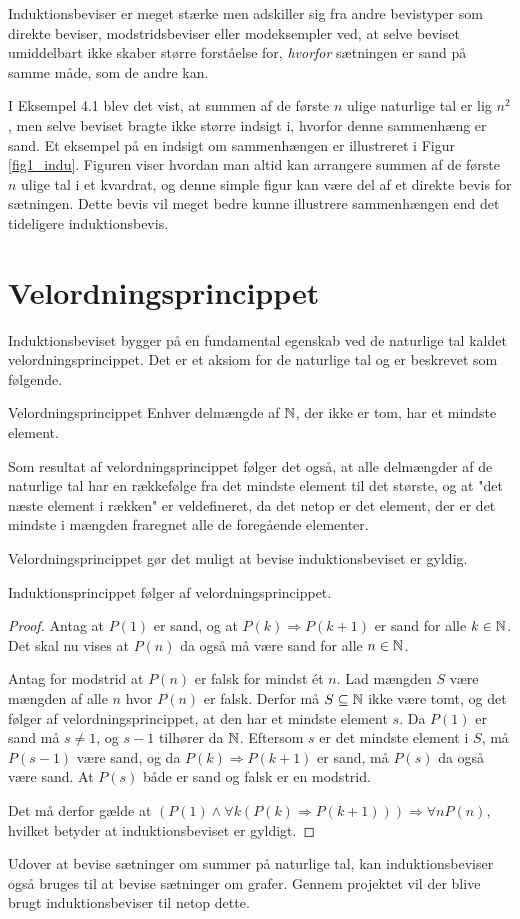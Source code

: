 Induktionsbeviser er meget stærke men adskiller sig fra andre bevistyper som direkte beviser, modstridsbeviser eller modeksempler ved, at selve beviset umiddelbart ikke skaber større forståelse for, \textit{hvorfor} sætningen er sand på samme måde, som de andre kan.

I Eksempel 4.1 blev det vist, at summen af de første $n$ ulige naturlige tal er lig $n^2$, men selve beviset bragte ikke større indsigt i, hvorfor denne sammenhæng er sand.
Et eksempel på en indsigt om sammenhængen er illustreret i  Figur \ref{fig1_indu}.
Figuren viser hvordan man altid kan arrangere summen af de første $n$ ulige tal i et kvardrat, og denne simple figur kan være del af et direkte bevis for sætningen.
Dette bevis vil meget bedre kunne illustrere sammenhængen end det tideligere induktionsbevis.

\section{Velordningsprincippet}
Induktionsbeviset bygger på en fundamental egenskab ved de naturlige tal kaldet velordningsprincippet.
Det er et aksiom for de naturlige tal og er beskrevet som følgende.
\begin{theorembox}{Velordningsprincippet}
	Enhver delmængde af $\mathbb{N}$, der ikke er tom, har et mindste element.
\end{theorembox}
\noindent Som resultat af velordningsprincippet følger det også, at alle delmængder af de naturlige tal har en rækkefølge fra det mindste element til det største, og at "det næste element i rækken" er veldefineret, da det netop er det element, der er det mindste i mængden fraregnet alle de foregående elementer.

Velordningsprincippet gør det muligt at bevise induktionsbeviset er gyldig.

\begin{thm}
	Induktionsprincippet følger af velordningsprincippet.
\end{thm}

\begin{proof}
	Antag at $P(1)$ er sand, og at $P(k) \Rightarrow P(k + 1)$ er sand for alle $k \in \mathbb{N}$.
	Det skal nu vises at $P(n)$ da også må være sand for alle $n \in \mathbb{N}$.

	Antag for modstrid at $P(n)$ er falsk for mindst ét $n$.
	Lad mængden $S$ være mængden af alle $n$ hvor $P(n)$ er falsk.
	Derfor må $S \subseteq \mathbb{N}$ ikke være tomt, og det følger af velordningsprincippet, at den har et mindste element $s$.
	Da $P(1)$ er sand må $s \neq 1$, og $s - 1$ tilhører da $\mathbb{N}$.
	Eftersom $s$ er det mindste element i $S$, må $P(s - 1)$ være sand, og da $P(k) \Rightarrow P(k+1)$ er sand, må $P(s)$ da også være sand.
	At $P(s)$ både er sand og falsk er en modstrid.

	Det må derfor gælde at $(P(1) \land \forall k ( P(k) \Rightarrow P(k + 1))) \Rightarrow \forall n P(n)$, hvilket betyder at induktionsbeviset er gyldigt.
\end{proof}

Udover at bevise sætninger om summer på naturlige tal, kan induktionsbeviser også bruges til at bevise sætninger om grafer.
Gennem projektet vil der blive brugt induktionsbeviser til netop dette.
